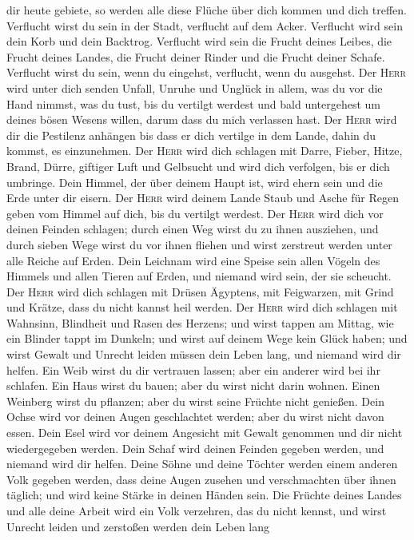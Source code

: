 dir heute gebiete, so werden alle diese Flüche über dich kommen und dich
treffen.  Verflucht wirst du sein in der Stadt, verflucht
auf dem Acker.  Verflucht wird sein dein Korb und dein
Backtrog.  Verflucht wird sein die Frucht deines Leibes,
die Frucht deines Landes, die Frucht deiner Rinder und die Frucht deiner
Schafe.  Verflucht wirst du sein, wenn du eingehst,
verflucht, wenn du ausgehst.  Der \textsc{Herr} wird
unter dich senden Unfall, Unruhe und Unglück in allem, was du vor die
Hand nimmst, was du tust, bis du vertilgt werdest und bald untergehest
um deines bösen Wesens willen, darum dass du mich verlassen hast.
 Der \textsc{Herr} wird dir die Pestilenz anhängen bis
dass er dich vertilge in dem Lande, dahin du kommst, es einzunehmen.
 Der \textsc{Herr} wird dich schlagen mit Darre, Fieber,
Hitze, Brand, Dürre, giftiger Luft und Gelbsucht und wird dich
verfolgen, bis er dich umbringe.  Dein Himmel, der über
deinem Haupt ist, wird ehern sein und die Erde unter dir eisern.
 Der \textsc{Herr} wird deinem Lande Staub und Asche für
Regen geben vom Himmel auf dich, bis du vertilgt werdest.
 Der \textsc{Herr} wird dich vor deinen Feinden schlagen;
durch einen Weg wirst du zu ihnen ausziehen, und durch sieben Wege wirst
du vor ihnen fliehen und wirst zerstreut werden unter alle Reiche auf
Erden.  Dein Leichnam wird eine Speise sein allen Vögeln
des Himmels und allen Tieren auf Erden, und niemand wird sein, der sie
scheucht.  Der \textsc{Herr} wird dich schlagen mit
Drüsen Ägyptens, mit Feigwarzen, mit Grind und Krätze, dass du nicht
kannst heil werden.  Der \textsc{Herr} wird dich schlagen
mit Wahnsinn, Blindheit und Rasen des Herzens;  und wirst
tappen am Mittag, wie ein Blinder tappt im Dunkeln; und wirst auf deinem
Wege kein Glück haben; und wirst Gewalt und Unrecht leiden müssen dein
Leben lang, und niemand wird dir helfen.  Ein Weib wirst
du dir vertrauen lassen; aber ein anderer wird bei ihr schlafen. Ein
Haus wirst du bauen; aber du wirst nicht darin wohnen. Einen Weinberg
wirst du pflanzen; aber du wirst seine Früchte nicht genießen.
 Dein Ochse wird vor deinen Augen geschlachtet werden;
aber du wirst nicht davon essen. Dein Esel wird vor deinem Angesicht mit
Gewalt genommen und dir nicht wiedergegeben werden. Dein Schaf wird
deinen Feinden gegeben werden, und niemand wird dir helfen.
 Deine Söhne und deine Töchter werden einem anderen Volk
gegeben werden, dass deine Augen zusehen und verschmachten über ihnen
täglich; und wird keine Stärke in deinen Händen sein. 
Die Früchte deines Landes und alle deine Arbeit wird ein Volk verzehren,
das du nicht kennst, und wirst Unrecht leiden und zerstoßen werden dein
Leben lang

